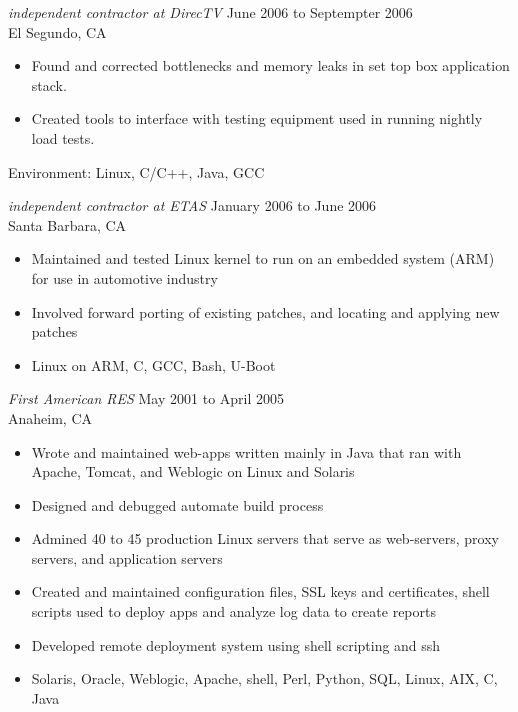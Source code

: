 \documentclass{res}
\begin{document}
\begin{resume}
{\sl independent contractor at DirecTV} \hfill June 2006 to Septempter 2006\\
El Segundo, CA

\begin{itemize}

\item Found and corrected bottlenecks and memory leaks in set top
box application stack.

\item Created tools to interface with testing equipment used in
running nightly load tests.

\end{itemize}

Environment:  Linux, C/C++, Java, GCC

{\sl independent contractor at ETAS} \hfill January 2006 to June 2006\\
Santa Barbara, CA
\begin{itemize}
\item Maintained and tested Linux kernel to run on an embedded
system (ARM) for use in automotive industry
\item Involved forward porting of existing patches, and locating and applying new patches
\item  Linux on ARM, C, GCC, Bash, U-Boot
\end{itemize}


{\sl First American RES} \hfill May 2001 to April 2005\\
Anaheim, CA
\begin{itemize}
\item Wrote and maintained web-apps written mainly in Java that ran
with Apache, Tomcat, and Weblogic on Linux and Solaris
\item Designed and debugged automate build process
\item Admined 40 to 45 production Linux servers that serve as
web-servers, proxy servers, and application servers
\item Created and maintained configuration files, 
SSL keys and certificates, shell scripts used to deploy apps and
analyze log data to create reports
\item Developed remote deployment system using shell scripting and
ssh
\item  Solaris, Oracle, Weblogic, Apache, shell, Perl, Python,
SQL, Linux, AIX, C, Java
\end{itemize}


\end{resume}
\end{document}
